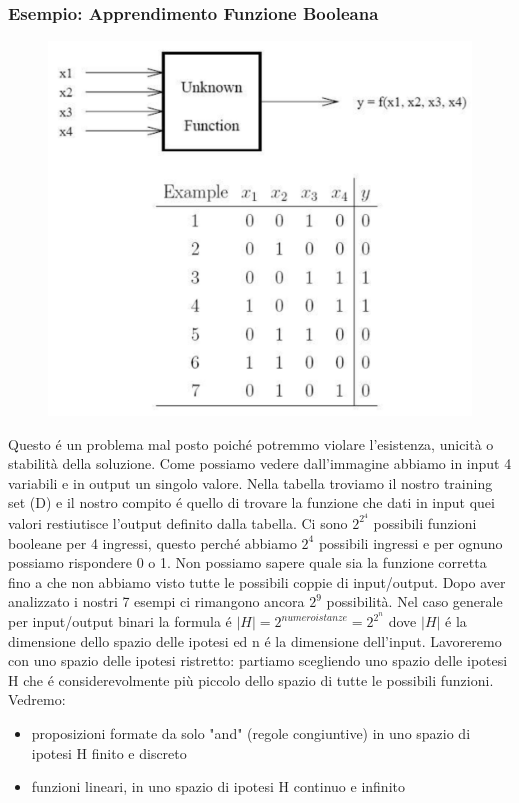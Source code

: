 \documentclass{article}
\begin{document}
\subsubsection{Esempio: Apprendimento Funzione Booleana}
\begin{figure}[H]
    \centering
    \includegraphics[scale=0.4]{Images/esempiofunzionebooleana.png}
\end{figure}
Questo é un problema mal posto poiché potremmo violare l'esistenza, unicità o stabilità della soluzione. Come possiamo vedere dall'immagine abbiamo in input 4 variabili e in output un singolo valore. Nella tabella troviamo il nostro training set (D) e il nostro compito é quello di trovare la funzione che dati in input quei valori restiutisce l'output definito dalla tabella. Ci sono $2^{2^4}$ possibili funzioni booleane per 4 ingressi, questo perché abbiamo $2^4$ possibili ingressi e per ognuno possiamo rispondere 0 o 1. Non possiamo sapere quale sia la funzione corretta fino a che non abbiamo visto tutte le possibili coppie di input/output. Dopo aver analizzato i nostri 7 esempi ci rimangono ancora $2^9$ possibilità. Nel caso generale per input/output binari la formula é $|H| = 2^{numeroistanze} = 2^{2^n}$ dove $|H|$ é la dimensione dello spazio delle ipotesi ed n é la dimensione dell'input. \newline
Lavoreremo con uno spazio delle ipotesi ristretto: partiamo scegliendo uno spazio delle ipotesi H che é considerevolmente più piccolo dello spazio di tutte le possibili funzioni. Vedremo: 
\begin{itemize}
    \item proposizioni formate da solo "and" (regole congiuntive) in uno spazio di ipotesi H finito e discreto
    \item funzioni lineari, in uno spazio di ipotesi H continuo e infinito
\end{itemize}
\end{document}
